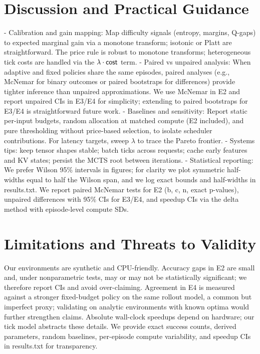 \section{Discussion and Practical Guidance}
\label{sec:guidance}
- Calibration and gain mapping: Map difficulty signals (entropy, margins, Q-gaps) to expected marginal gain via a monotone transform; isotonic or Platt \cite{Platt1999} are straightforward. The price rule is robust to monotone transforms; heterogeneous tick costs are handled via the $\lambda \cdot \mathsf{cost}$ term.
- Paired vs unpaired analysis: When adaptive and fixed policies share the same episodes, paired analyses (e.g., McNemar for binary outcomes or paired bootstraps for differences) provide tighter inference than unpaired approximations. We use McNemar in E2 and report unpaired CIs in E3/E4 for simplicity; extending to paired bootstraps for E3/E4 is straightforward future work.
- Baselines and sensitivity: Report static per-input budgets, random allocation at matched compute (E2 included), and pure thresholding without price-based selection, to isolate scheduler contributions. For latency targets, sweep $\lambda$ to trace the Pareto frontier.
- Systems tips: keep tensor shapes stable; batch ticks across requests; cache early features and KV states; persist the MCTS root between iterations.
- Statistical reporting: We prefer Wilson 95\% intervals in figures; for clarity we plot symmetric half-widths equal to half the Wilson span, and we log exact bounds and half-widths in results.txt. We report paired McNemar tests for E2 (b, c, n, exact p-values), unpaired differences with 95\% CIs for E3/E4, and speedup CIs via the delta method with episode-level compute SDs.

\section{Limitations and Threats to Validity}
Our environments are synthetic and CPU-friendly. Accuracy gaps in E2 are small and, under nonparametric tests, may or may not be statistically significant; we therefore report CIs and avoid over-claiming. Agreement in E4 is measured against a stronger fixed-budget policy on the same rollout model, a common but imperfect proxy; validating on analytic environments with known optima would further strengthen claims. Absolute wall-clock speedups depend on hardware; our tick model abstracts these details. We provide exact success counts, derived parameters, random baselines, per-episode compute variability, and speedup CIs in results.txt for transparency.

